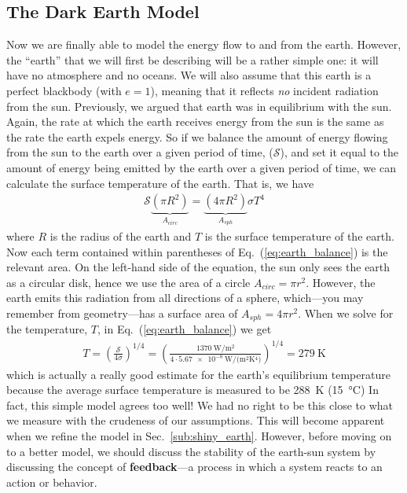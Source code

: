     \subsection{The Dark Earth Model} %
    \label{sub:dark_earth}

    Now we are finally able to model the energy flow to and from the earth. However, the ``earth'' that we will first be describing will be a rather simple one: it will have no atmosphere and no oceans. We will also assume that this earth is a perfect blackbody (with $e =1$), meaning that it reflects \emph{no} incident radiation from the sun. Previously, we argued that earth was in equilibrium with the sun. Again, the rate at which the earth receives energy from the sun is the same as the rate the earth expels energy. So if we balance the amount of energy flowing from the sun to the earth over a given period of time, ($\mathcal{S}$), and set it equal to the amount of energy being emitted by the earth over a given period of time, we can calculate the surface temperature of the earth. That is, we have
    \begin{align}
        \mathcal{S}\underbrace{(\pi R^2)}_{A_{circ}} = \underbrace{(4\pi R^2)}_{A_{sph}} \sigma T^4
        \label{eq:earth_balance}
    \end{align}
    where $R$ is the radius of the earth and $T$ is the surface temperature of the earth. Now each term contained within parentheses of Eq.~(\ref{eq:earth_balance}) is the relevant area. On the left-hand side of the equation, the sun only sees the earth as a circular disk, hence we use the area of a circle $A_{circ} = \pi r^2$. However, the earth emits this radiation from all directions of a sphere, which---you may remember from geometry---has a surface area of $A_{sph} = 4 \pi r^2$. When we solve for the temperature, $T$, in Eq.~(\ref{eq:earth_balance}) we get 
    \begin{align}
        T = \left( \frac{\mathcal{S}}{4 \sigma} \right)^{1/4} = \left( \frac{\SI{1370}{\watt/\meter^2}}{4 \cdot \SI{5.67e-8}{\watt/(\meter^2 \kelvin^4)} } \right)^{1/4} = \SI{279}{\kelvin}
        \label{eq:earth_temp}
    \end{align}
    which is actually a really good estimate for the earth's equilibrium temperature because the average surface temperature is measured to be \SI{288}{\kelvin} (\SI{15}{\celsius}) \citep{schroeder1999introduction} In fact, this simple model agrees too well! We had no right to be this close to what we measure with the crudeness of our assumptions. This will become apparent when we refine the model in Sec.~\ref{sub:shiny_earth}. However, before moving on to a better model, we should discuss the stability of the earth-sun system by discussing the concept of \textbf{feedback}---a process in which a system reacts to an action or behavior.



